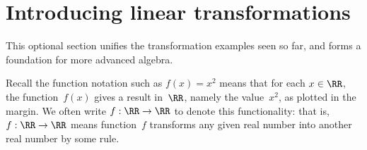 

\section{Introducing linear transformations}
\label{sec:ilt}
\secttoc
\begin{comment}
\pooliv{\S3.6} \layiv{\S1.8--9} \holti{\S3.1}
\end{comment}


\begin{aside}
This optional section unifies the transformation examples seen so far, and forms a foundation for more advanced algebra. 
\end{aside}

Recall the function notation such as \(f(x)=x^2\) means that for each \(x\in\RR\), the function~\(f(x)\) gives a result in~\(\RR\), namely the value~\(x^2\), as plotted in the margin.  
%
We often write \(f:\RR\to\RR\) to denote this functionality: that is, \(f:\RR\to\RR\) means function~\(f\) transforms any given real number into another real number by some rule.

